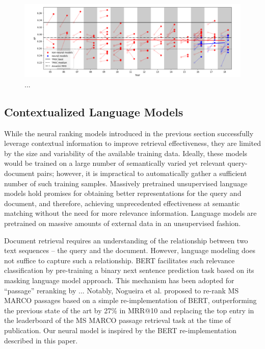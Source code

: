 \begin{figure}[b!]
\centering
  \includegraphics[width=6in]{neural_robust04.png}
\caption{...}
\label{fig:neural_robust04}
\end{figure}

\subsection{Contextualized Language Models}

While the neural ranking models introduced in the previous section successfully leverage contextual information to improve retrieval effectiveness, they are limited by the size and variability of the available training data.
Ideally, these models would be trained on a large number of semantically varied yet relevant query-document pairs; however, it is impractical to automatically gather a sufficient number of such training samples.
Massively pretrained unsupervised language models hold promises for obtaining better representations for the query and document, and therefore, achieving unprecedented effectiveness at semantic matching without the need for more relevance information.
Language models are pretrained on massive amounts of external data in an unsupervised fashion.

Document retrieval requires an understanding of the relationship between two text sequences -- the query and the document.
However, language modeling does not suffice to capture such a relationship.
BERT facilitates such relevance classification by pre-training a binary next sentence prediction task based on its masking language model approach.
This mechanism has been adopted for ``passage'' reranking by ...
Notably, Nogueira et al. \cite{nogueira2019passage} proposed to re-rank MS MARCO passages based on a simple re-implementation of BERT, outperforming the previous state of the art by 27\% in MRR@10 and replacing the top entry in the leaderboard of the MS MARCO passage retrieval task at the time of publication.
Our neural model is inspired by the BERT re-implementation described in this paper.

